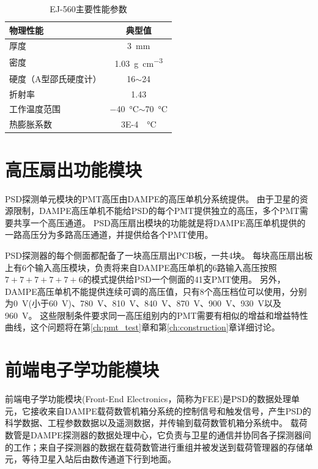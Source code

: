 \begin{table}[htb]
	\centering
	\caption{EJ-560主要性能参数}
	\label{tab:description:ej560}
	
	\begin{tabulary}{0.6\linewidth}{LC}
		\toprule[1.5pt]
		\textbf{物理性能} & \textbf{典型值}                              \\ 
		\midrule[1pt]
		厚度            & \SI{3}{\milli\meter}                      \\
		密度            & \SI{1.03}{\g\per\cubic\centi\meter}       \\
		硬度（A型邵氏硬度计）   & 16$\sim$24                                \\
		折射率           & 1.43                                      \\
		工作温度范围        & \SI{-40}{\celsius}$\sim$\SI{70}{\celsius} \\
		热膨胀系数         & \SI{3E-4}{\per\celsius}                   \\ 
		\bottomrule[1.5pt]
	\end{tabulary}
	
\end{table}

\section{高压扇出功能模块}
\label{sec:description:psd_hv}
PSD探测单元模块的PMT高压由DAMPE的高压单机分系统提供。
由于卫星的资源限制，DAMPE高压单机不能给PSD的每个PMT提供独立的高压，多个PMT需要共享一个高压通道。
PSD高压扇出模块的功能就是将DAMPE高压单机提供的一路高压分为多路高压通道，并提供给各个PMT使用。

PSD探测器的每个侧面都配备了一块高压扇出PCB板，一共4块。
每块高压扇出板上有6个输入高压模块，负责将来自DAMPE高压单机的6路输入高压按照$7+7+7+7+7+6$的模式提供给PSD一个侧面的41支PMT使用。
另外，DAMPE高压单机不能提供连续可调的高压值，只有8个高压档位可以使用，分别为\SI{0}{V}(小于\SI{60}{V})、\SI{780}{V}、\SI{810}{V}、\SI{840}{V}、\SI{870}{V}、\SI{900}{V}、\SI{930}{V}以及\SI{960}{\volt}。
这些限制条件要求同一高压组别内的PMT需要有相似的增益和增益特性曲线，这个问题将在第\ref{ch:pmt_test}章和第\ref{ch:construction}章详细讨论。

\section{前端电子学功能模块}
\label{sec:description:psd_electronics}
前端电子学功能模块(Front-End Electronics，简称为FEE)是PSD的数据处理单元，它接收来自DAMPE载荷数管机箱分系统的控制信号和触发信号，产生PSD的科学数据、工程参数数据以及遥测数据，并传输到载荷数管机箱分系统中。
载荷数管是DAMPE探测器的数据处理中心，它负责与卫星的通信并协同各子探测器间的工作；来自子探测器的数据在载荷数管进行重组并被发送到载荷管理器的存储单元，等待卫星入站后由数传通道下行到地面。

